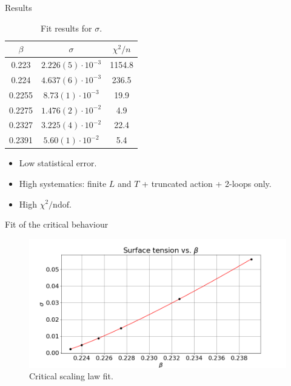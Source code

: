 \documentclass[12pt,handout]{beamer}
\begin{document}
\begin{frame}{Results}
\begin{center}
\begin{table}[!htb]
\centering
\begin{tabular}{|c|c|c|}
\hline
$\beta$ & $\sigma$ & $\chi ^2 /n$ \\
\hline
0.223 &  $2.226(5) \cdot 10^{-3}$ & 1154.8\\
\hline
0.224 & $4.637(6) \cdot 10^{-3} $ & 236.5\\
\hline
0.2255 & $8.73(1)\cdot 10^{-3}$ & 19.9\\
\hline
0.2275 & $1.476(2)\cdot 10^{-2}$ & 4.9\\
\hline
0.2327 & $3.225(4)\cdot 10 ^{-2}$ & 22.4\\
\hline
0.2391 & $5.60(1)\cdot 10^{-2}$ & 5.4\\
\hline
\end{tabular}
\caption{Fit results for $\sigma$.\label{tab:fitsigma}}
\end{table}
\begin{itemize}
\item Low statistical error.
\item High systematics: finite $L$ and $T$ + truncated action + 2-loops only.
\item High $\chi ^2/\mbox{ndof}$.
\end{itemize}
\end{center}
\end{frame}


\begin{frame}{Fit of the critical behaviour}
\begin{center}
\begin{figure}
\centering
\includegraphics[scale=0.4, center]{sbeta.png}
\caption{Critical scaling law fit.\label{fig:scalinglaw}}
\end{figure}

\end{center}
\end{frame}
\end{document}
